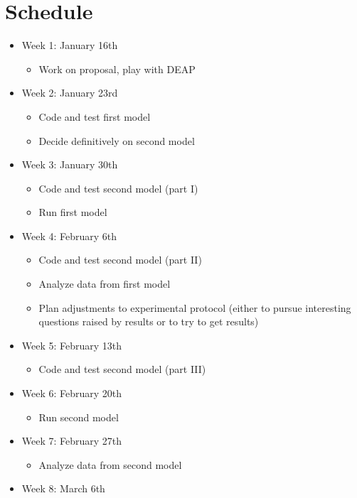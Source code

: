 \section{Schedule}

\begin{itemize}
  \item Week 1: January 16th
  \begin{itemize}
  	\item Work on proposal, play with DEAP
  \end{itemize}
  \item Week 2: January 23rd
  \begin{itemize}
  	\item Code and test first model
    \item Decide definitively on second model
  \end{itemize}
  \item Week 3: January 30th
  \begin{itemize}
  	\item Code and test second model (part I)
  	\item Run first model
  \end{itemize}
  \item Week 4: February 6th
  \begin{itemize}
  	\item Code and test second model (part II)
  	\item Analyze data from first model
    \item Plan adjustments to experimental protocol (either to pursue interesting questions raised by results or to try to get results)
  \end{itemize}
  \item Week 5: February 13th
  \begin{itemize}
  	\item Code and test second model (part III)
  \end{itemize}
  \item Week 6: February 20th
  \begin{itemize}
  	\item Run second model
  \end{itemize}
  \item Week 7: February 27th
  \begin{itemize}
  	\item Analyze data from second model
  \end{itemize}
  \item Week 8: March 6th
  \begin{itemize}

\end{itemize}
\end{itemize}

